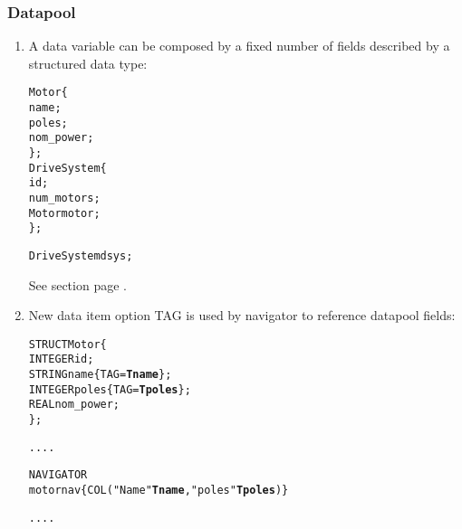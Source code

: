 \subsubsection{Datapool}
\begin{enumerate}
\item A data variable can be composed by a fixed number of
  fields described by a structured data type:

\begin{boxedminipage}[t]{\linewidth}
\begin{alltt}
  \STRUCT Motor \{
    \STRING    name;
    \INTEGER   poles;
    \REAL      nom_power;
  \};
  \STRUCT DriveSystem \{
    \STRING  id;
    \INTEGER  num_motors;
    Motor motor;
  \};
       
  DriveSystem dsys;
\end{alltt}
\end{boxedminipage}

See section  page \pageref{sec:dpstruct}. \\
\item New data item option TAG is used by navigator to reference datapool fields:

\begin{boxedminipage}[t]{\linewidth}
\begin{alltt}
  STRUCT Motor \{
    INTEGER   id;
    STRING    name         \{TAG={\bfseries Tname}\};
    INTEGER   poles        \{TAG={\bfseries Tpoles}\};
    REAL      nom_power;
  \};

  ....

  NAVIGATOR
    motornav \{ COL( "Name" {\bfseries Tname}, "poles" {\bfseries Tpoles} ) \}

  ....

\end{alltt}
\end{boxedminipage}


\end{enumerate}
